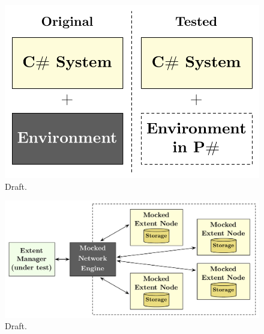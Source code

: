 \begin{figure}[t]
\centering
\includegraphics[width=\linewidth]{img/models_new}
\caption{Draft.}
\label{fig:newapproach}
\end{figure}

\begin{figure}[t]
\centering
\includegraphics[width=\linewidth]{img/azurestore_model}
\caption{Draft.}
\label{fig:azurestoremodel}
\end{figure}

